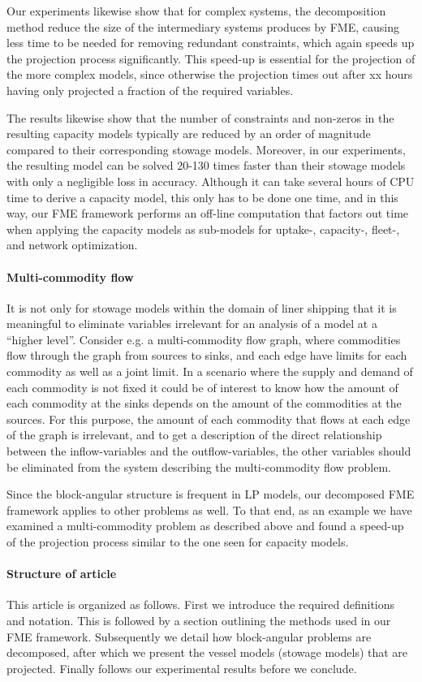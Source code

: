 Our experiments likewise show that for complex systems, the decomposition method reduce the size of the intermediary systems produces by FME, causing less time to be needed for removing redundant constraints, which again speeds up the projection process significantly. This speed-up is essential for the projection of the more complex models, since otherwise the projection times out after xx hours having only projected a fraction of the required variables.

The results likewise show that the number of constraints and non-zeros in the resulting capacity models typically are reduced by an order of magnitude compared to their corresponding stowage models. Moreover, in our experiments, the resulting model can be solved 20-130 times faster than their stowage models with only a negligible loss in accuracy. Although it can take several hours of CPU time to derive a capacity model, this only has to be done one time, and in this way, our FME framework performs an off-line computation that factors out time when applying the capacity models as sub-models for uptake-, capacity-, fleet-, and network optimization.

\paragraph{Multi-commodity flow}
It is not only for stowage models within the domain of liner shipping that it is meaningful to eliminate variables irrelevant for an analysis of a model at a ``higher level''. Consider e.g. a multi-commodity flow graph, where commodities flow through the graph from sources to sinks, and each edge have limits for each commodity as well as a joint limit. In a scenario where the supply and demand of each commodity is not fixed it could be of interest to know how the amount of each commodity at the sinks depends on the amount of the commodities at the sources. For this purpose, the amount of each commodity that flows at each edge of the graph is irrelevant, and to get a description of the direct relationship between the inflow-variables and the outflow-variables, the other variables should be eliminated from the system describing the multi-commodity flow problem.

Since the block-angular structure is frequent in LP models, our decomposed FME framework applies to other problems as well. To that end, as an example we have examined a multi-commodity problem as described above and found a speed-up of the projection process similar to the one seen for capacity models.

\paragraph{Structure of article}
This article is organized as follows. First we introduce the required definitions and notation. This is followed by a section outlining the methods used in our FME framework. Subsequently we detail how block-angular problems are decomposed, after which we present the vessel models (stowage models) that are projected. Finally follows our experimental results before we conclude.

{}



